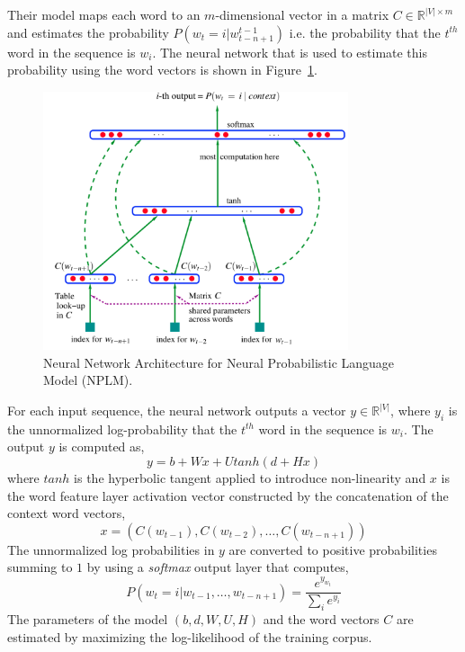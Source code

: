 Their model maps each word to an $m$-dimensional vector in a matrix $C \in \mathbb{R}^{|V|\times m}$ and estimates the probability $P(w_{t} = i|w_{t-n+1}^{t-1})$ i.e. the probability that the $t^{th}$ word in the sequence is $w_{i}$. The neural network that is used to estimate this probability using the word vectors is shown in Figure~\ref{fig:nn:bengio}.
\begin{figure}[t!]
    \centering
        \includegraphics[width=0.8\textwidth]{figs/bengio_nn.png}
    \caption{Neural Network Architecture for Neural Probabilistic Language Model (NPLM). \cite{bengio2003neural}}
    \label{fig:nn:bengio}
\end{figure}
For each input sequence, the neural network outputs a vector $y \in \mathbb{R}^{|V|}$, where $y_{i}$ is the unnormalized log-probability that the $t^{th}$ word in the sequence is $w_{i}$. 
The output $y$ is computed as,
\begin{equation}
y = b + Wx + Utanh(d + Hx)
\end{equation}
where $tanh$ is the hyperbolic tangent applied to introduce non-linearity and $x$ is the word feature layer activation vector constructed by the concatenation of the context word vectors,
\begin{equation}
x = (C(w_{t-1}), C(w_{t-2}), \ldots, C(w_{t-n+1}))
\end{equation}
The unnormalized log probabilities in $y$ are converted to positive probabilities summing to $1$ by using a \emph{softmax} output layer that computes, 
\begin{equation}
P(w_{t} = i | w_{t-1}, \ldots, w_{t-n+1}) = \frac{e^{y_{w_t}}}{\sum_{i}e^{y_{i}}}
\end{equation}
The parameters of the model $(b, d, W, U, H)$ and the word vectors $C$ are estimated by maximizing the log-likelihood of the training corpus.

